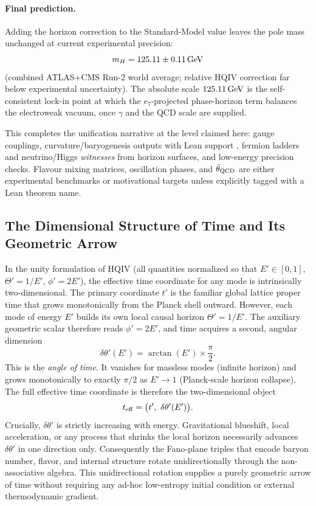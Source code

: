 \documentclass[12pt,a4paper]{article}
\begin{document}
\paragraph{Final prediction.}
Adding the horizon correction to the Standard-Model value leaves the pole mass unchanged at current experimental precision:
\[
m_H = 125.11 \pm 0.11\,\rm GeV
\]
(combined ATLAS+CMS Run-2 world average; relative HQIV correction far below experimental uncertainty). The absolute scale $125.11\,\rm GeV$ is the self-consistent lock-in point at which the $e_7$-projected phase-horizon term balances the electroweak vacuum, once $\gamma$ and the QCD scale are supplied.

This completes the unification narrative at the level claimed here: gauge couplings, curvature/baryogenesis outputs with Lean support \citep{hqiv-lean}, fermion ladders and neutrino/Higgs \emph{witnesses} from horizon surfaces, and low-energy precision checks. Flavour mixing matrices, oscillation phases, and $\bar{\theta}_{\rm QCD}$ are either experimental benchmarks or motivational targets unless explicitly tagged with a Lean theorem name.

\subsection{The Dimensional Structure of Time and Its Geometric Arrow}

In the unity formulation of HQIV (all quantities normalized so that $E' \in [0,1]$, $\Theta' = 1/E'$, $\phi' = 2E'$), the effective time coordinate for any mode is intrinsically two-dimensional. The primary coordinate $t'$ is the familiar global lattice proper time that grows monotonically from the Planck shell outward. However, each mode of energy $E'$ builds its own local causal horizon $\Theta' = 1/E'$. The auxiliary geometric scalar therefore reads $\phi' = 2E'$, and time acquires a second, angular dimension
\[
\delta\theta'(E') = \arctan(E') \times \frac{\pi}{2}.
\]
This is the \emph{angle of time}. It vanishes for massless modes (infinite horizon) and grows monotonically to exactly $\pi/2$ as $E' \to 1$ (Planck-scale horizon collapse). The full effective time coordinate is therefore the two-dimensional object
\[
t_{\rm eff} = \bigl(t',\ \delta\theta'(E')\bigr).
\]
Crucially, $\delta\theta'$ is strictly increasing with energy. Gravitational blueshift, local acceleration, or any process that shrinks the local horizon necessarily advances $\delta\theta'$ in one direction only. Consequently the Fano-plane triples that encode baryon number, flavor, and internal structure rotate unidirectionally through the non-associative algebra. This unidirectional rotation supplies a purely geometric arrow of time without requiring any ad-hoc low-entropy initial condition or external thermodynamic gradient.
\end{document}
